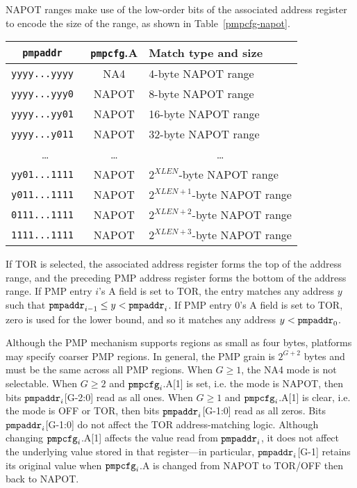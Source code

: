 NAPOT ranges make use of the low-order bits of the associated address register
to encode the size of the range, as shown in Table~\ref{pmpcfg-napot}.

\begin{table*}[h!]
\begin{center}
  \begin{tabular}{|c|c|l|}
  \hline
  \tt pmpaddr    & {\tt pmpcfg}.A & Match type and size \\
  \hline
  \tt yyyy...yyyy & NA4   & 4-byte NAPOT range \\
  \tt yyyy...yyy0 & NAPOT & 8-byte NAPOT range \\
  \tt yyyy...yy01 & NAPOT & 16-byte NAPOT range \\
  \tt yyyy...y011 & NAPOT & 32-byte NAPOT range \\
  \multicolumn{1}{|c|}{\ldots} &  \ldots  & \multicolumn{1}{|c|}{\ldots} \\
  \tt yy01...1111 & NAPOT & $2^{XLEN}$-byte NAPOT range \\
  \tt y011...1111 & NAPOT & $2^{XLEN+1}$-byte NAPOT range \\
  \tt 0111...1111 & NAPOT & $2^{XLEN+2}$-byte NAPOT range \\
  \tt 1111...1111 & NAPOT & $2^{XLEN+3}$-byte NAPOT range \\
  \hline
  \end{tabular}
\end{center}
\caption{NAPOT range encoding in PMP address and configuration registers.}
\label{pmpcfg-napot}
\end{table*}

If TOR is selected, the associated address register forms the top of the
address range, and the preceding PMP address register forms the bottom of the
address range.  If PMP entry $i$'s A field is set to TOR, the entry matches
any address $y$ such that ${\tt pmpaddr}_{i-1}\leq y < {\tt pmpaddr}_i$.  If
PMP entry 0's A field is set to TOR, zero is used for the lower bound, and so
it matches any address $y < {\tt pmpaddr}_0$.

Although the PMP mechanism supports regions as small as four bytes, platforms
may specify coarser PMP regions. In general, the PMP grain is $2^{G+2}$ bytes
and must be the same across all PMP regions.  When $G \geq 1$, the NA4 mode
is not selectable.  When $G \geq 2$ and ${\tt pmpcfg}_i$.A[1] is set, i.e.
the mode is NAPOT, then bits ${\tt pmpaddr}_i$[G-2:0] read as all ones.  When
$G \geq 1$ and ${\tt pmpcfg}_i$.A[1] is clear, i.e. the mode is OFF or TOR,
then bits ${\tt pmpaddr}_i$[G-1:0] read as all zeros.  Bits ${\tt
pmpaddr}_i$[G-1:0] do not affect the TOR address-matching logic.
Although changing ${\tt pmpcfg}_i$.A[1] affects the value read from
${\tt pmpaddr}_i$, it does not affect the underlying value stored in that
register---in particular, ${\tt pmpaddr}_i$[G-1] retains its original value
when ${\tt pmpcfg}_i$.A is changed from NAPOT to TOR/OFF then back to NAPOT.

